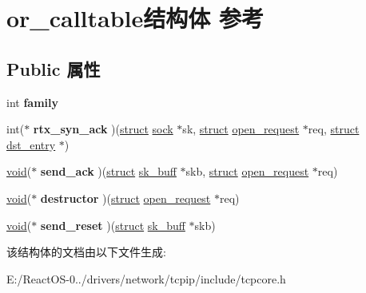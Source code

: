 \hypertarget{structor__calltable}{}\section{or\+\_\+calltable结构体 参考}
\label{structor__calltable}
\subsection*{Public 属性}
\begin{DoxyCompactItemize}
\item 
\mbox{\label{structor__calltable_aab7f1cf089a056e5fd6cf77583ec1e48}} 
int {\bfseries family}
\item 
\mbox{\label{structor__calltable_a6bdd7010f0ef8677492ab36bf409de7e}} 
int($\ast$ {\bfseries rtx\+\_\+syn\+\_\+ack} )(\hyperlink{interfacestruct}{struct} \hyperlink{structsock}{sock} $\ast$sk, \hyperlink{interfacestruct}{struct} \hyperlink{structopen__request}{open\+\_\+request} $\ast$req, \hyperlink{interfacestruct}{struct} \hyperlink{structdst__entry}{dst\+\_\+entry} $\ast$)
\item 
\mbox{\label{structor__calltable_a92f264de8dee5be393bf591eeccdece1}} 
\hyperlink{interfacevoid}{void}($\ast$ {\bfseries send\+\_\+ack} )(\hyperlink{interfacestruct}{struct} \hyperlink{structsk__buff}{sk\+\_\+buff} $\ast$skb, \hyperlink{interfacestruct}{struct} \hyperlink{structopen__request}{open\+\_\+request} $\ast$req)
\item 
\mbox{\label{structor__calltable_a82e9274e9e8b9c4bf0fbbd5b4bfbdf14}} 
\hyperlink{interfacevoid}{void}($\ast$ {\bfseries destructor} )(\hyperlink{interfacestruct}{struct} \hyperlink{structopen__request}{open\+\_\+request} $\ast$req)
\item 
\mbox{\label{structor__calltable_a4924e9889c50abad98ecb54b71edb0f2}} 
\hyperlink{interfacevoid}{void}($\ast$ {\bfseries send\+\_\+reset} )(\hyperlink{interfacestruct}{struct} \hyperlink{structsk__buff}{sk\+\_\+buff} $\ast$skb)
\end{DoxyCompactItemize}


该结构体的文档由以下文件生成\+:\begin{DoxyCompactItemize}
\item 
E\+:/\+React\+O\+S-\/0../drivers/network/tcpip/include/tcpcore.\+h\end{DoxyCompactItemize}
